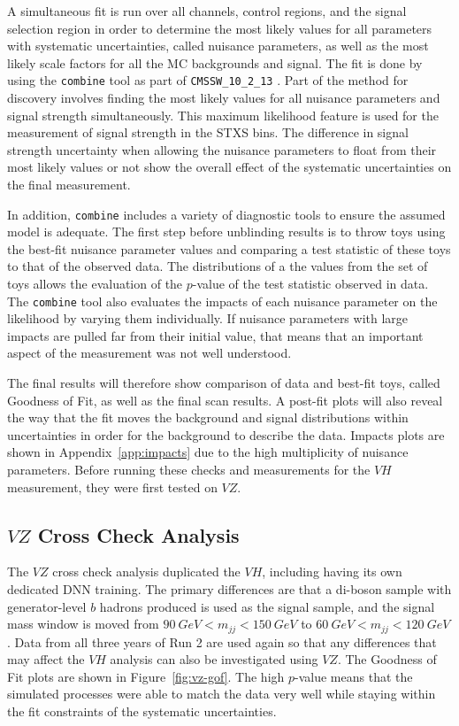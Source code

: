 A simultaneous fit is run over all channels, control regions, and the signal selection region
in order to determine the most likely values for all
parameters with systematic uncertainties, called nuisance parameters,
as well as the most likely scale factors for all the MC backgrounds and signal.
The fit is done by using the \texttt{combine} tool \cite{cmsdocumentation} as part of
\texttt{CMSSW\_10\_2\_13} \cite{cmssw_doxygen}.
Part of the method for discovery involves finding the most likely values
for all nuisance parameters and signal strength simultaneously.
This maximum likelihood feature is used for the measurement of signal strength in
the STXS bins.
The difference in signal strength uncertainty when allowing the nuisance parameters to float
from their most likely values or not show the overall effect of the systematic uncertainties
on the final measurement.

In addition, \texttt{combine} includes a variety of diagnostic tools to ensure
the assumed model is adequate.
The first step before unblinding results is to throw toys using the best-fit
nuisance parameter values and comparing a test statistic of these toys to that of the observed data.
The distributions of a the values from the set of toys allows the evaluation of the $p$-value
of the test statistic observed in data.
The \texttt{combine} tool also evaluates the impacts of each
nuisance parameter on the likelihood by varying them individually.
If nuisance parameters with large impacts are pulled far from their initial value,
that means that an important aspect of the measurement was not well understood.

The final results will therefore show comparison of data and best-fit toys,
called Goodness of Fit, as well as the final scan results.
A post-fit plots will also reveal the way that the fit moves the background and signal distributions
within uncertainties in order for the background to describe the data.
Impacts plots are shown in Appendix~\ref{app:impacts} due to the high multiplicity of nuisance parameters.
Before running these checks and measurements for the $V\!H$ measurement,
they were first tested on $V\!Z$.

\subsection{$V\!Z$ Cross Check Analysis}

The $V\!Z$ cross check analysis duplicated the $V\!H$, including having its own dedicated DNN training.
The primary differences are that a di-boson sample with generator-level $b$ hadrons produced
is used as the signal sample, and the signal mass window is moved from $\SI{90}{GeV} < m_{jj} < \SI{150}{GeV}$
to  $\SI{60}{GeV} < m_{jj} < \SI{120}{GeV}$.
Data from all three years of Run 2 are used again so that any differences that may affect the $V\!H$ analysis
can also be investigated using $V\!Z$.
The Goodness of Fit plots are shown in Figure~\ref{fig:vz-gof}.
The high $p$-value means that the simulated processes were able to match the data very well
while staying within the fit constraints of the systematic uncertainties.


